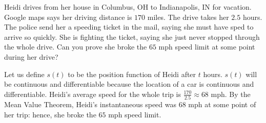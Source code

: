 \documentclass[nooutcomes,handout]{ximera}
\begin{document}
\begin{problem}
  Heidi drives from her house in Columbus, OH to Indianapolis, IN for vacation.
  Google maps says her driving distance is $170$ miles.
  The drive takes her $2.5$ hours.
  The police send her a speeding ticket in the mail, saying she must have sped to arrive so quickly.
  She is fighting the ticket, saying she just never stopped through the whole drive.
  Can you prove she broke the $65$ mph speed limit at some point during her drive?
  \begin{freeResponse}
    Let us define $s(t)$ to be the position function of Heidi after $t$ hours.
    $s(t)$ will be continuous and differentiable because the location of a car is continuous and differentiable.
    Heidi's average speed for the whole trip is $\frac{170}{2.5}\approx 68$ mph.
    By the Mean Value Theorem, Heidi’s instantaneous speed was $68$ mph at some point of her trip: hence, she broke the $65$ mph speed limit.
  \end{freeResponse}
\end{problem}
\end{document}
